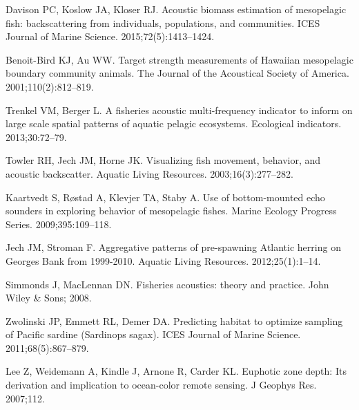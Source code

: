 \documentclass[10pt,letterpaper]{article}
\begin{document}
%
%
% 
\begin{thebibliography}{10}

Davison PC, Koslow JA, Kloser RJ.
\newblock Acoustic biomass estimation of mesopelagic fish: backscattering from
  individuals, populations, and communities.
\newblock ICES Journal of Marine Science. 2015;72(5):1413--1424.

Benoit-Bird KJ, Au WW.
\newblock Target strength measurements of Hawaiian mesopelagic boundary
  community animals.
\newblock The Journal of the Acoustical Society of America.
  2001;110(2):812--819.

Trenkel VM, Berger L.
\newblock A fisheries acoustic multi-frequency indicator to inform on large
  scale spatial patterns of aquatic pelagic ecosystems.
\newblock Ecological indicators. 2013;30:72--79.

Towler RH, Jech JM, Horne JK.
\newblock Visualizing fish movement, behavior, and acoustic backscatter.
\newblock Aquatic Living Resources. 2003;16(3):277--282.

Kaartvedt S, R{\o}stad A, Klevjer TA, Staby A.
\newblock Use of bottom-mounted echo sounders in exploring behavior of
  mesopelagic fishes.
\newblock Marine Ecology Progress Series. 2009;395:109--118.

Jech JM, Stroman F.
\newblock Aggregative patterns of pre-spawning Atlantic herring on Georges Bank
  from 1999-2010.
\newblock Aquatic Living Resources. 2012;25(1):1--14.

Simmonds J, MacLennan DN.
\newblock Fisheries acoustics: theory and practice.
\newblock John Wiley \& Sons; 2008.

Zwolinski JP, Emmett RL, Demer DA.
\newblock Predicting habitat to optimize sampling of Pacific sardine (Sardinops
  sagax).
\newblock ICES Journal of Marine Science. 2011;68(5):867--879.

Lee Z, Weidemann A, Kindle J, Arnone R, Carder KL.
\newblock Euphotic zone depth: Its derivation and implication to ocean-color
  remote sensing.
\newblock J Geophys Res. 2007;112.


\end{thebibliography}
\end{document}
